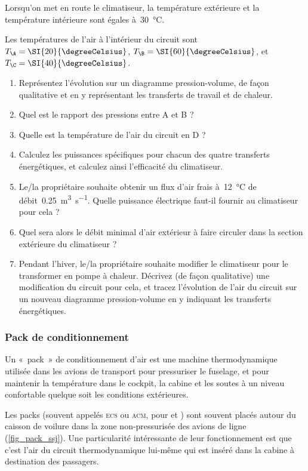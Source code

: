 	Lorsqu’on met en route le climatiseur, la température extérieure et la température intérieure sont égales à~\SI{30}{\degreeCelsius}.
 
	Les températures de l’air à l’intérieur du circuit sont $T_\A = \SI{20}{\degreeCelsius}$, $T_\B = \SI{60}{\degreeCelsius}$, et~$T_\C = \SI{40}{\degreeCelsius}$.

	\begin{enumerate}
		\item Représentez l’évolution sur un diagramme pression-volume, de façon qualitative et en y représentant les transferts de travail et de chaleur.
		\item Quel est le rapport des pressions entre A et B ?
		\item Quelle est la température de l’air du circuit en D ?
		\item Calculez les puissances spécifiques pour chacun des quatre transferts énergétiques, et calculez ainsi l’efficacité du climatiseur.
		\item Le/la propriétaire souhaite obtenir un flux d’air frais à~\SI{12}{\degreeCelsius} de débit~\SI{0,25}{\metre\cubed\per\second}. Quelle puissance électrique faut-il fournir au climatiseur pour cela ?
		\item Quel sera alors le débit minimal d’air extérieur à faire circuler dans la section extérieure du climatiseur ?
		\item Pendant l’hiver, le/la propriétaire souhaite modifier le climatiseur pour le transformer en pompe à chaleur. Décrivez (de façon qualitative) une modification du circuit pour cela, et tracez l’évolution de l’air du circuit sur un nouveau diagramme pression-volume en y indiquant les transferts énergétiques.
	\end{enumerate}


\subsubsection{Pack de conditionnement}
\label{exo_pack_conditonnement}

	Un «~pack~» de conditionnement d’air est une machine thermodynamique utilisée dans les avions de transport pour pressuriser le fuselage, et pour maintenir la température dans le cockpit, la cabine et les soutes à un niveau confortable quelque soit les conditions extérieures.
	
	Les packs (souvent appelés \textsc{ecs} ou \textsc{acm}, pour  et ) sont souvent placés autour du caisson de voilure dans la zone non-pressurisée des avions de ligne (\cref{fig_pack_ssj}). Une particularité intéressante de leur fonctionnement est que c’est l’air du circuit thermodynamique lui-même qui est inséré dans la cabine à destination des passagers.
	
